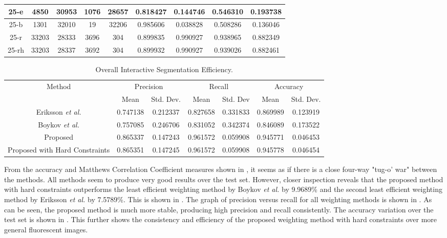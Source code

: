 \begin{longtable}[!h]{|c|c|c|c|c|c|c|c|c|}
	\hline	25-e	&	4850	&	30953	&	1076	&	28657	&	0.818427	&	0.144746	&	0.546310	&	0.193738	\\
	\hline \rowcolor{bad}	25-b	&	1301	&	32010	&	19	&	32206	&	0.985606	&	0.038828	&	0.508286	&	0.136046	\\
	\hline	25-r	&	33203	&	28333	&	3696	&	304	&	0.899835	&	0.990927	&	0.938965	&	0.882349	\\
	\hline \rowcolor{closest}	25-rh	&	33203	&	28337	&	3692	&	304	&	0.899932	&	0.990927	&	0.939026	&	0.882461	\\
	\hline 
\end{longtable} 

\begin{longtable}[!h]{|c|c|c|c|c|c|c|}
	\caption{Overall Interactive Segmentation Efficiency.} \label{tab:overallinteractivesegmentationefficiency}\\
	\hline 
	\multirow{2}{*}{Method} & \multicolumn{2}{c|}{Precision} & \multicolumn{2}{c|}{Recall} & \multicolumn{2}{c|}{Accuracy} \\ 
	\hhline{~------}
	& Mean & Std. Dev. & Mean & Std. Dev & Mean & Std. Dev.  \\ 
	\hline	Eriksson \textit{et al.}	&	0.747138	&	0.212337	&	0.827658	&	0.331833	&	0.869989	&	0.123919	\\
	\hline \rowcolor{bad}	Boykov \textit{et al.}	&	0.757085	&	0.246706	&	0.831052	&	0.342374	&	0.846089	&	0.173522	\\
	\hline	Proposed	&	0.865337	&	0.147243	&	0.961572	&	0.059908	&	0.945771	&	0.046453	\\
	\hline \rowcolor{closest}	Proposed with Hard Constraints	&	0.865351	&	0.147245	&	0.961572	&	0.059908	&	0.945778	&	0.046454	\\	
	\hline
\end{longtable}

From the accuracy and Matthews Correlation Coefficient measures shown in , it seems as if there is a close four-way "tug-o' war" between the methods. All methods seem to produce very good results over the test set. However, closer inspection reveals that the proposed method with hard constraints outperforms the least efficient weighting method by Boykov \textit{et al.} by 9.9689\% and the second least efficient weighting method by Eriksson \textit{et al.} by 7.5789\%. This is shown in . The graph of precision versus recall for all weighting methods is shown in . As can be seen, the proposed method is much more stable, producing high precision and recall consistently. The accuracy variation over the test set is shown in . This further shows the consistency and efficiency of the proposed weighting method with hard constraints over more general fluorescent images.

